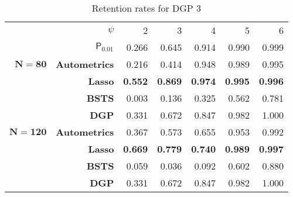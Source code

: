 \begin{table}[htbp]
  \centering

    \begin{tabular}{r|r|rrrrr}

          & \boldmath{}\textbf{$\psi$}\unboldmath{} & 2     & 3     & 4     & 5     & 6 \\
        

          & \textbf{$\mathsf{P}_{0.01}$} & 0.266 & 0.645 & 0.914 & 0.990 & 0.999 \\
            \hline
          \hline
   $ \bm{N=80}$ & \textbf{Autometrics} & 0.216 & 0.414 & 0.948 & 0.989 & 0.995 \\
    \textbf{} & \textbf{Lasso} & \textbf{0.552 }& \textbf{0.869} & \textbf{0.974} & \textbf{0.995 }& \textbf{0.996} \\
    \textbf{} & \textbf{BSTS} & 0.003 & 0.136 & 0.325 & 0.562 & 0.781 \\
    \hline
    \textbf{} & \textbf{DGP} & 0.331 & 0.672 & 0.847 & 0.982 & 1.000 \\
    \hline
    \hline
   $ \bm{N=120}$ & \textbf{Autometrics} & 0.367 & 0.573 & 0.655 & 0.953 & 0.992 \\
    \textbf{} & \textbf{Lasso} & \textbf{0.669} & \textbf{0.779} & \textbf{0.740} & \textbf{0.989} & \textbf{0.997} \\
    \textbf{} & \textbf{BSTS} & 0.059 & 0.036 & 0.092 & 0.602 & 0.880 \\
    \hline
    \textbf{} & \textbf{DGP} & 0.331 & 0.672 & 0.847 & 0.982 & 1.000 \\

    \end{tabular}%
      \caption{Retention rates for DGP 3}
  \label{DGP3RR}%
\end{table}%
